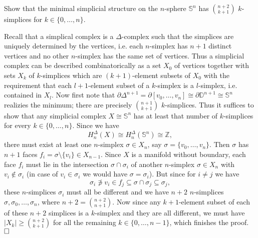 \documentclass[11pt]{book}
\numberwithin{dummy}{section}
\theoremstyle{nonumberbreak}
\newenvironment{sol}[1][]{\ifthenelse{\equal{#1}{}}{\solution}{\solution[#1]}\rm}{\endsolution}
\newenvironment{prob}[1][]{\ifthenelse{\equal{#1}{}}{\problem}{\problem[#1]}\rm}{\endproblem}
\newcommand{\Sph}{\mathbb{S}}
\newcommand{\Z}{\mathbb{Z}}
\begin{document}
\begin{spacing}{1.4}
\begin{prob}
\end{prob}


\begin{prob} %
Show that the minimal simplicial structure on the $n$-sphere $\Sph^n$ has $\binom{n+2}{k+1}$ $k$-simplices for $k \in \{0, \ldots, n \}$.

\begin{sol} 
Recall that a simplical complex is a $\Delta$-complex such that the simplices are uniquely determined by the vertices, i.e. each $n$-simplex has $n+1$ distinct vertices and no other $n$-simplex has the same set of vertices. Thus a simplicial complex can be described combinatorically as a set $X_0$ of vertices together with sets $X_k$ of $k$-simplices which are $(k+1)$-element subsets of $X_0$ with the requirement that each $l+1$-element subset of a $k$-simplex is a $l$-simplex, i.e. contained in $X_l$. Now first note that $\partial \Delta^{n+1} = \partial [v_0, \ldots, v_n] \cong \partial \mathbb{D}^{n+1} \cong \Sph^n$ realizies the minimum; there are precisely $\binom{n+1}{k+1}$ $k$-simplices. Thus it suffices to show that any simplicial complex $X \cong \Sph^n$ has at least that number of $k$-simplices for every $k \in \{0, \ldots, n \}$. Since we have 
$$H_n^{\Delta}(X) \cong H_n^{\Delta}(\Sph^n) \cong \Z,$$
there must exist at least one $n$-simplex $\sigma \in X_n$, say $\sigma = \{v_0, \ldots, v_n\}$. Then $\sigma$ has $n+1$ faces $f_i = \sigma \setminus \{v_i\} \in X_{n-1}$. Since $X$ is a manifold without boundary, each face $f_i$ must lie in the intersection $\sigma \cap \sigma_i$ of another $n$-simplex $\sigma \in X_n$ with $v_i \notin \sigma_i$ (in case of $v_i \in \sigma_i$ we would have $\sigma = \sigma_i$). But since for $i\neq j$ we have
$$\sigma_i \notni v_i \in f_j \subseteq \sigma \cap \sigma_j \subseteq \sigma_j,$$
these $n$-simplices $\sigma_i$ must all be different and we have $n+2$ $n$-simplices $\sigma, \sigma_0, \ldots, \sigma_n$, where $n+2 = \binom{n+2}{n+1}$. Now since any $k+1$-element subset of each of these $n+2$ simplices is a $k$-simplex and they are all different, we must have $\vert X_k\vert \geqslant \binom{n+2}{k+1}$ for all the remaining $k\in \{0, \ldots, n-1\}$, which finishes the proof. $\hfill \Box$

\end{sol}
\end{prob}





\end{spacing}
\end{document}
